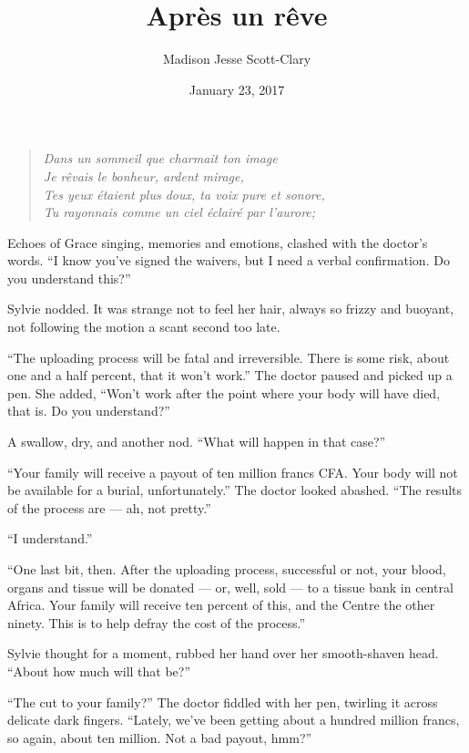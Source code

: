 \documentclass[12pt,letterpaper,oneside]{memoir}
\title{Apr\`{e}s un r\^{e}ve}
\author{Madison Jesse Scott-Clary}
\date{January 23, 2017}
\begin{document}
  \maketitle

  \begin{quote}
  \emph{Dans un sommeil que charmait ton image\\
  Je r\^{e}vais le bonheur, ardent mirage,\\
  Tes yeux \'{e}taient plus doux, ta voix pure et sonore,\\
  Tu rayonnais comme un ciel \'{e}clair\'{e} par l'aurore;}
  \end{quote}

  Echoes of Grace singing, memories and emotions, clashed with the
  doctor's words. ``I know you've signed the waivers, but I need a verbal
  confirmation. Do you understand this?''

  Sylvie nodded. It was strange not to feel her hair, always so frizzy and
  buoyant, not following the motion a scant second too late.

  ``The uploading process will be fatal and irreversible. There is some
  risk, about one and a half percent, that it won't work.'' The doctor
  paused and picked up a pen. She added, ``Won't work after the point
  where your body will have died, that is. Do you understand?''

  A swallow, dry, and another nod. ``What will happen in that case?''

  ``Your family will receive a payout of ten million francs CFA. Your body
  will not be available for a burial, unfortunately.'' The doctor looked
  abashed. ``The results of the process are --- ah, not pretty.''

  ``I understand.''

  ``One last bit, then. After the uploading process, successful or not,
  your blood, organs and tissue will be donated --- or, well, sold --- to
  a tissue bank in central Africa. Your family will receive ten percent of
  this, and the Centre the other ninety. This is to help defray the cost
  of the process.''

  Sylvie thought for a moment, rubbed her hand over her smooth-shaven
  head. ``About how much will that be?''

  ``The cut to your family?'' The doctor fiddled with her pen, twirling it
  across delicate dark fingers. ``Lately, we've been getting about a
  hundred million francs, so again, about ten million. Not a bad payout,
  hmm?''
\end{document}
